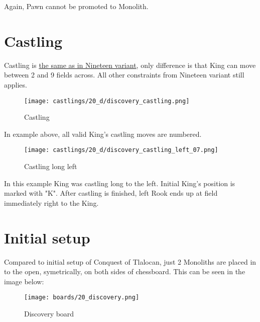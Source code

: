 Again, Pawn cannot be promoted to Monolith.

\clearpage %

\section*{Castling}
\label{sec:Discovery/Castling}

Castling is
\hyperref[sec:Nineteen/Castling]{the same as in Nineteen variant},
only difference is that King can move
between 2 and 9 fields across. All other constraints from Nineteen variant still
applies.

\noindent
\begin{figure}[!h]
\texttt{[image: castlings/20\_d/discovery\_castling.png]}
\caption{Castling}
\label{fig:discovery_castling}
\end{figure}

In example above, all valid King's castling moves are numbered.

\noindent
\begin{figure}[!h]
\texttt{[image: castlings/20\_d/discovery\_castling\_left\_07.png]}
\caption{Castling long left}
\label{fig:discovery_castling_left_07}
\end{figure}

In this example King was castling long to the left. Initial King's position is marked with "K".
After castling is finished, left Rook ends up at field immediately right to the King.

\clearpage %

\section*{Initial setup}
\label{sec:Discovery/Initial setup}

Compared to initial setup of Conquest of Tlalocan, just 2 Monoliths are placed in to the open,
symetrically, on both sides of chessboard. This can be seen in the image below:

\noindent
\begin{figure}[h]
\texttt{[image: boards/20\_discovery.png]}
\caption{Discovery board}
\label{fig:20_discovery}
\end{figure}

\clearpage %

